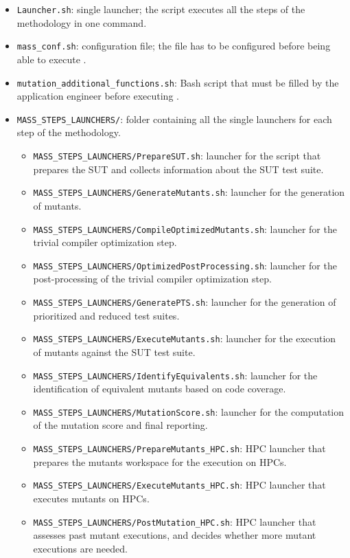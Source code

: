 \begin{itemize}
	\item \texttt{Launcher.sh}: \MASS single launcher; the script executes all the steps of the methodology in one command.
	\item \texttt{mass\_conf.sh}: \MASS configuration file; the file has to be configured before being able to execute \MASS.
	\item \texttt{mutation\_additional\_functions.sh}: Bash script that must be filled by the application engineer before executing \MASS.
	\item \texttt{MASS\_STEPS\_LAUNCHERS/}: folder containing all the single launchers for each step of the \MASS methodology.
	\begin{itemize}
		\item \texttt{MASS\_STEPS\_LAUNCHERS/PrepareSUT.sh}: launcher for the script that prepares the SUT and collects information about the SUT test suite.
		\item \texttt{MASS\_STEPS\_LAUNCHERS/GenerateMutants.sh}: launcher for the generation of mutants.
		\item \texttt{MASS\_STEPS\_LAUNCHERS/CompileOptimizedMutants.sh}: launcher for the trivial compiler optimization step.
		\item \texttt{MASS\_STEPS\_LAUNCHERS/OptimizedPostProcessing.sh}: launcher for the post-processing of the trivial compiler optimization step.
		\item \texttt{MASS\_STEPS\_LAUNCHERS/GeneratePTS.sh}: launcher for the generation of prioritized and reduced test suites.
		\item \texttt{MASS\_STEPS\_LAUNCHERS/ExecuteMutants.sh}: launcher for the execution of mutants against the SUT test suite.
		\item \texttt{MASS\_STEPS\_LAUNCHERS/IdentifyEquivalents.sh}: launcher for the identification of equivalent mutants based on code coverage.
		\item \texttt{MASS\_STEPS\_LAUNCHERS/MutationScore.sh}: launcher for the computation of the mutation score and final reporting.
		\item \texttt{MASS\_STEPS\_LAUNCHERS/PrepareMutants\_HPC.sh}: HPC launcher that prepares the mutants workspace for the execution on HPCs.
		\item \texttt{MASS\_STEPS\_LAUNCHERS/ExecuteMutants\_HPC.sh}: HPC launcher that executes mutants on HPCs.
		\item \texttt{MASS\_STEPS\_LAUNCHERS/PostMutation\_HPC.sh}: HPC launcher that assesses past mutant executions, and decides whether more mutant executions are needed.
	\end{itemize}

\end{itemize}

